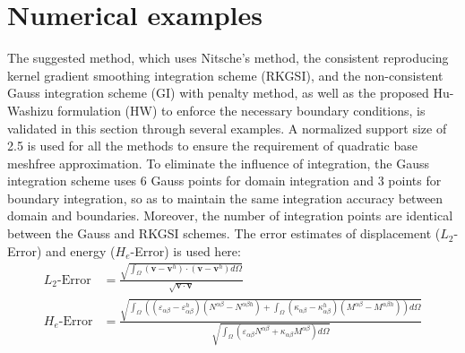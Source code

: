 
\section{Numerical examples}\label{examples}
The suggested method, which uses Nitsche's method, the consistent reproducing kernel gradient smoothing integration scheme (RKGSI), and the non-consistent Gauss integration scheme (GI) with penalty method, as well as the proposed Hu-Washizu formulation (HW) to enforce the necessary boundary conditions, is validated in this section through several examples. A normalized support size of 2.5 is used for all the methods to ensure the requirement of quadratic base meshfree approximation. To eliminate the influence of integration, the Gauss integration scheme uses 6 Gauss points for domain integration and 3 points for boundary integration, so as to maintain the same integration accuracy between domain and boundaries. Moreover, the number of integration points are identical between the Gauss and RKGSI schemes. The error estimates of displacement ($L_2$-Error) and energy ($H_e$-Error) is used here:
\begin{equation}
\begin{split}
L_2\text{-Error} &= \frac{\sqrt{\int_\Omega(\boldsymbol v - \boldsymbol v^h) \cdot (\boldsymbol v - \boldsymbol v^h)d\Omega}}{\sqrt{\boldsymbol v \cdot \boldsymbol v}} \\
H_e\text{-Error} &= \frac{\sqrt{\int_\Omega \left ((\varepsilon_{\alpha\beta} - \varepsilon_{\alpha\beta}^h)(N^{\alpha\beta} - N^{\alpha\beta h}) + \int_\Omega(\kappa_{\alpha\beta}-\kappa_{\alpha\beta}^h)(M^{\alpha\beta}-M^{\alpha\beta h}) \right )d\Omega}}{\sqrt{\int_\Omega(\varepsilon_{\alpha\beta}N^{\alpha\beta} + \kappa_{\alpha\beta}M^{\alpha\beta})d\Omega}}
\end{split}
\end{equation}

